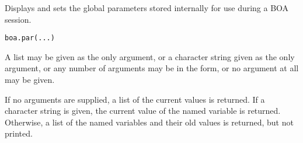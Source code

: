 \begin{Description}\relax
Displays and sets the global parameters stored internally for use during a
BOA session.
\end{Description}
\begin{Usage}
\begin{verbatim}
boa.par(...)
\end{verbatim}
\end{Usage}
\begin{Arguments}
\begin{ldescription}
\item[\code{...}] A list may be given as the only argument, or a character string 
given as the only argument, or any number of arguments may be in the 
 form, or no argument at all may be given.
\end{ldescription}
\end{Arguments}
\begin{Value}
If no arguments are supplied, a list of the current values is returned. If a 
character string is given, the current value of the named variable is returned. 
Otherwise, a list of the named variables and their old values is returned, but 
not printed.
\end{Value}
